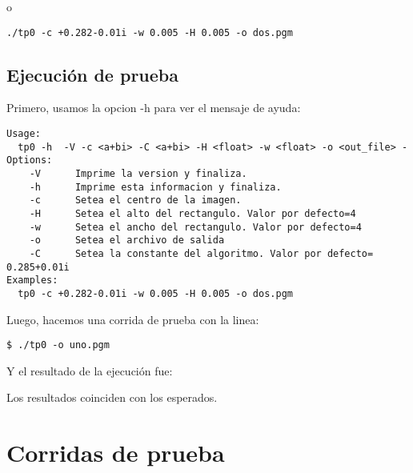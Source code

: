 \bigskip
o

\bigskip
\texttt{./tp0 -c +0.282-0.01i -w 0.005 -H 0.005 -o dos.pgm}

	
\subsection{Ejecución de prueba}
     Primero, usamos la opcion -h para ver el mensaje de ayuda:
     \begin{verbatim}
Usage:
  tp0 -h  -V -c <a+bi> -C <a+bi> -H <float> -w <float> -o <out_file> -
Options:
    -V	    Imprime la version y finaliza.
    -h	    Imprime esta informacion y finaliza.
    -c	    Setea el centro de la imagen.
    -H	    Setea el alto del rectangulo. Valor por defecto=4
    -w	    Setea el ancho del rectangulo. Valor por defecto=4
    -o	    Setea el archivo de salida
    -C	    Setea la constante del algoritmo. Valor por defecto= 0.285+0.01i
Examples:
  tp0 -c +0.282-0.01i -w 0.005 -H 0.005 -o dos.pgm
 	     \end{verbatim}
	     
Luego, hacemos una corrida de prueba con la linea:

\bigskip
\texttt{\$  ./tp0 -o uno.pgm}

\bigskip
Y el resultado de la ejecución fue:

\bigskip

\bigskip
Los resultados coinciden con los esperados.

\section{Corridas de prueba}

